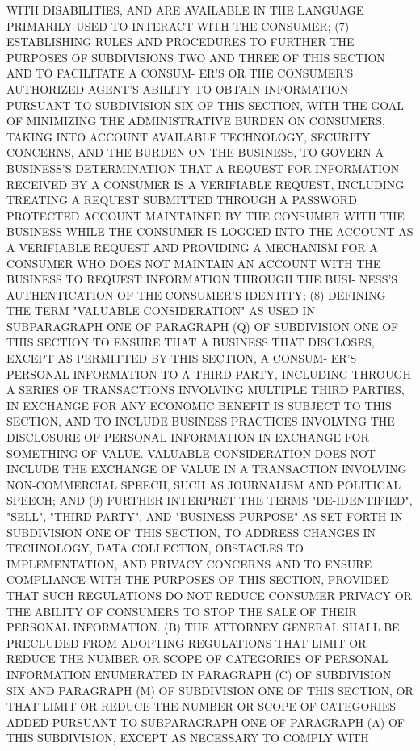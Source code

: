  WITH  DISABILITIES,  AND ARE AVAILABLE IN THE LANGUAGE PRIMARILY USED TO
 INTERACT WITH THE CONSUMER;
   (7)  ESTABLISHING  RULES  AND  PROCEDURES  TO  FURTHER THE PURPOSES OF
 SUBDIVISIONS TWO AND THREE OF THIS SECTION AND TO FACILITATE  A  CONSUM-
 ER'S  OR THE CONSUMER'S AUTHORIZED AGENT'S ABILITY TO OBTAIN INFORMATION
 PURSUANT TO SUBDIVISION SIX OF THIS SECTION, WITH THE GOAL OF MINIMIZING
 THE ADMINISTRATIVE BURDEN ON CONSUMERS, TAKING  INTO  ACCOUNT  AVAILABLE
 TECHNOLOGY, SECURITY CONCERNS, AND THE BURDEN ON THE BUSINESS, TO GOVERN
 A  BUSINESS'S DETERMINATION THAT A REQUEST FOR INFORMATION RECEIVED BY A
 CONSUMER IS A VERIFIABLE REQUEST, INCLUDING TREATING A REQUEST SUBMITTED
 THROUGH A PASSWORD PROTECTED ACCOUNT MAINTAINED BY THE CONSUMER WITH THE
 BUSINESS WHILE THE CONSUMER IS LOGGED INTO THE ACCOUNT AS  A  VERIFIABLE
 REQUEST  AND  PROVIDING A MECHANISM FOR A CONSUMER WHO DOES NOT MAINTAIN
 AN ACCOUNT WITH THE BUSINESS TO REQUEST INFORMATION  THROUGH  THE  BUSI-
 NESS'S AUTHENTICATION OF THE CONSUMER'S IDENTITY;
   (8) DEFINING THE TERM "VALUABLE CONSIDERATION" AS USED IN SUBPARAGRAPH
 ONE OF PARAGRAPH (Q) OF SUBDIVISION ONE OF THIS SECTION TO ENSURE THAT A
 BUSINESS  THAT DISCLOSES, EXCEPT AS PERMITTED BY THIS SECTION, A CONSUM-
 ER'S PERSONAL INFORMATION TO A THIRD PARTY, INCLUDING THROUGH  A  SERIES
 OF  TRANSACTIONS  INVOLVING  MULTIPLE THIRD PARTIES, IN EXCHANGE FOR ANY
 ECONOMIC BENEFIT IS SUBJECT TO THIS SECTION,  AND  TO  INCLUDE  BUSINESS
 PRACTICES  INVOLVING  THE DISCLOSURE OF PERSONAL INFORMATION IN EXCHANGE
 FOR SOMETHING OF VALUE. VALUABLE  CONSIDERATION  DOES  NOT  INCLUDE  THE
 EXCHANGE OF VALUE IN A TRANSACTION INVOLVING NON-COMMERCIAL SPEECH, SUCH
 AS JOURNALISM AND POLITICAL SPEECH; AND
   (9)  FURTHER  INTERPRET  THE  TERMS  "DE-IDENTIFIED",  "SELL",  "THIRD
 PARTY", AND "BUSINESS PURPOSE" AS SET FORTH IN SUBDIVISION ONE  OF  THIS
 SECTION, TO ADDRESS CHANGES IN TECHNOLOGY, DATA COLLECTION, OBSTACLES TO
 IMPLEMENTATION,  AND  PRIVACY CONCERNS AND TO ENSURE COMPLIANCE WITH THE
 PURPOSES OF THIS SECTION, PROVIDED THAT SUCH REGULATIONS DO  NOT  REDUCE
 CONSUMER  PRIVACY  OR THE ABILITY OF CONSUMERS TO STOP THE SALE OF THEIR
 PERSONAL INFORMATION.
   (B) THE ATTORNEY GENERAL SHALL BE PRECLUDED FROM ADOPTING  REGULATIONS
 THAT  LIMIT  OR  REDUCE  THE  NUMBER  OR SCOPE OF CATEGORIES OF PERSONAL
 INFORMATION ENUMERATED IN PARAGRAPH (C) OF SUBDIVISION SIX AND PARAGRAPH
 (M) OF SUBDIVISION ONE OF THIS SECTION, OR  THAT  LIMIT  OR  REDUCE  THE
 NUMBER  OR  SCOPE  OF  CATEGORIES  ADDED PURSUANT TO SUBPARAGRAPH ONE OF
 PARAGRAPH (A) OF THIS SUBDIVISION, EXCEPT AS NECESSARY  TO  COMPLY  WITH
